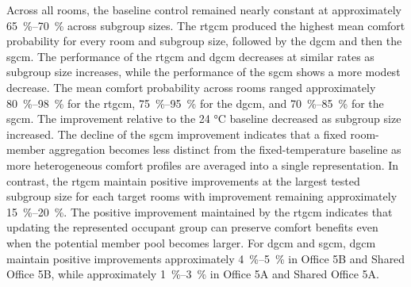 
Across all rooms, the baseline control remained nearly constant at approximately \qtyrange{65}{70}{\percent} across subgroup sizes.
The \ac{rtgcm} produced the highest mean comfort probability for every room and subgroup size, followed by the \ac{dgcm} and then the \ac{sgcm}.
The performance of the \ac{rtgcm} and \ac{dgcm} decreases at similar rates as subgroup size increases, while the performance of the \ac{sgcm} shows a more modest decrease.
The mean comfort probability across rooms ranged approximately \qtyrange{80}{98}{\percent} for the \ac{rtgcm}, \qtyrange{75}{95}{\percent} for the \ac{dgcm}, and \qtyrange{70}{85}{\percent} for the \ac{sgcm}.
The improvement relative to the 24 \si{\celsius} baseline decreased as subgroup size increased.
The decline of the \ac{sgcm} improvement indicates that a fixed room-member aggregation becomes less distinct from the fixed-temperature baseline as more heterogeneous comfort profiles are averaged into a single representation.
In contrast, the \ac{rtgcm} maintain positive improvements at the largest tested subgroup size for each target rooms with improvement remaining approximately \qtyrange{15}{20}{\percent}.
The positive improvement maintained by the \ac{rtgcm} indicates that updating the represented occupant group can preserve comfort benefits even when the potential member pool becomes larger.
For \ac{dgcm} and \ac{sgcm}, \ac{dgcm} maintain positive improvements approximately \qtyrange{4}{5}{\percent} in Office 5B and Shared Office 5B, while approximately \qtyrange{1}{3}{\percent} in Office 5A and Shared Office 5A.

